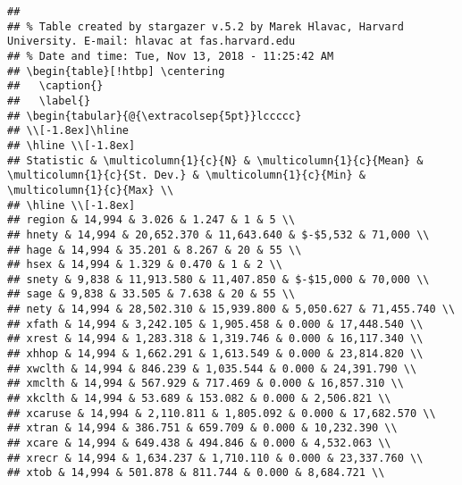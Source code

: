 \documentclass[]{article}
\begin{document}
\begin{verbatim}
## 
## % Table created by stargazer v.5.2 by Marek Hlavac, Harvard University. E-mail: hlavac at fas.harvard.edu
## % Date and time: Tue, Nov 13, 2018 - 11:25:42 AM
## \begin{table}[!htbp] \centering 
##   \caption{} 
##   \label{} 
## \begin{tabular}{@{\extracolsep{5pt}}lccccc} 
## \\[-1.8ex]\hline 
## \hline \\[-1.8ex] 
## Statistic & \multicolumn{1}{c}{N} & \multicolumn{1}{c}{Mean} & \multicolumn{1}{c}{St. Dev.} & \multicolumn{1}{c}{Min} & \multicolumn{1}{c}{Max} \\ 
## \hline \\[-1.8ex] 
## region & 14,994 & 3.026 & 1.247 & 1 & 5 \\ 
## hnety & 14,994 & 20,652.370 & 11,643.640 & $-$5,532 & 71,000 \\ 
## hage & 14,994 & 35.201 & 8.267 & 20 & 55 \\ 
## hsex & 14,994 & 1.329 & 0.470 & 1 & 2 \\ 
## snety & 9,838 & 11,913.580 & 11,407.850 & $-$15,000 & 70,000 \\ 
## sage & 9,838 & 33.505 & 7.638 & 20 & 55 \\ 
## nety & 14,994 & 28,502.310 & 15,939.800 & 5,050.627 & 71,455.740 \\ 
## xfath & 14,994 & 3,242.105 & 1,905.458 & 0.000 & 17,448.540 \\ 
## xrest & 14,994 & 1,283.318 & 1,319.746 & 0.000 & 16,117.340 \\ 
## xhhop & 14,994 & 1,662.291 & 1,613.549 & 0.000 & 23,814.820 \\ 
## xwclth & 14,994 & 846.239 & 1,035.544 & 0.000 & 24,391.790 \\ 
## xmclth & 14,994 & 567.929 & 717.469 & 0.000 & 16,857.310 \\ 
## xkclth & 14,994 & 53.689 & 153.082 & 0.000 & 2,506.821 \\ 
## xcaruse & 14,994 & 2,110.811 & 1,805.092 & 0.000 & 17,682.570 \\ 
## xtran & 14,994 & 386.751 & 659.709 & 0.000 & 10,232.390 \\ 
## xcare & 14,994 & 649.438 & 494.846 & 0.000 & 4,532.063 \\ 
## xrecr & 14,994 & 1,634.237 & 1,710.110 & 0.000 & 23,337.760 \\ 
## xtob & 14,994 & 501.878 & 811.744 & 0.000 & 8,684.721 \\ 

\end{verbatim}
\end{document}

